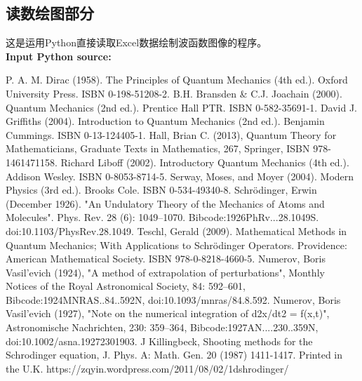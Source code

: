 \documentclass[twoside,twocolumn]{article}
\begin{document}
\begin{CJK*}{UTF8}{gkai}
\begin{appendices}
\section{读数绘图部分}
这是运用Python直接读取Excel数据绘制波函数图像的程序。\\
\textbf{\textcolor[rgb]{0.98,0.00,0.00}{Input Python source:}}

\end{appendices}


\newpage
\renewcommand\refname{参考文献}
\begin{thebibliography}{99}
P. A. M. Dirac (1958). The Principles of Quantum Mechanics (4th ed.). Oxford University Press. ISBN 0-198-51208-2.
B.H. Bransden \& C.J. Joachain (2000). Quantum Mechanics (2nd ed.). Prentice Hall PTR. ISBN 0-582-35691-1.
David J. Griffiths (2004). Introduction to Quantum Mechanics (2nd ed.). Benjamin Cummings. ISBN 0-13-124405-1.
Hall, Brian C. (2013), Quantum Theory for Mathematicians, Graduate Texts in Mathematics, 267, Springer, ISBN 978-1461471158.
Richard Liboff (2002). Introductory Quantum Mechanics (4th ed.). Addison Wesley. ISBN 0-8053-8714-5.
Serway, Moses, and Moyer (2004). Modern Physics (3rd ed.). Brooks Cole. ISBN 0-534-49340-8.
Schrödinger, Erwin (December 1926). "An Undulatory Theory of the Mechanics of Atoms and Molecules". Phys. Rev. 28 (6): 1049–1070. Bibcode:1926PhRv...28.1049S. doi:10.1103/PhysRev.28.1049.
Teschl, Gerald (2009). Mathematical Methods in Quantum Mechanics; With Applications to Schrödinger Operators. Providence: American Mathematical Society. ISBN 978-0-8218-4660-5.
Numerov, Boris Vasil'evich (1924), "A method of extrapolation of perturbations", Monthly Notices of the Royal Astronomical Society, 84: 592–601, Bibcode:1924MNRAS..84..592N, doi:10.1093/mnras/84.8.592.
Numerov, Boris Vasil'evich (1927), "Note on the numerical integration of d2x/dt2 = f(x,t)", Astronomische Nachrichten, 230: 359–364, Bibcode:1927AN....230..359N, doi:10.1002/asna.19272301903.
J Killingbeck, Shooting methods for the Schrodinger equation, J. Phys. A: Math. Gen. 20 (1987) 1411-1417. Printed in the U.K.
https://zqyin.wordpress.com/2011/08/02/1dshrodinger/
\end{thebibliography} 

\end{CJK*}
\end{document}
